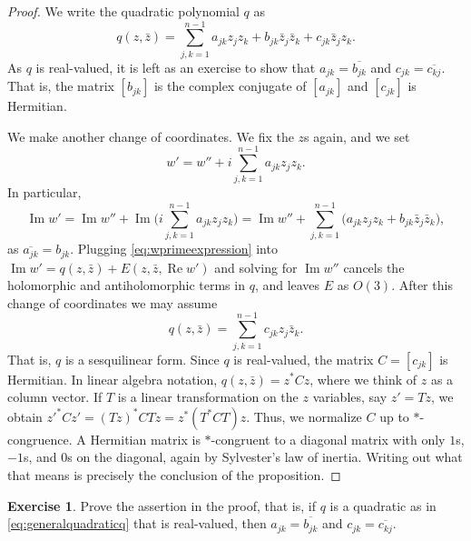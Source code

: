 \documentclass[12pt,openany]{book}
\renewcommand{\Re}{\operatorname{Re}}
\renewcommand{\Im}{\operatorname{Im}}
\theoremstyle{plain}
\theoremstyle{remark}
\theoremstyle{definition}
\newenvironment{exbox}{%
    \def\FrameCommand{\vrule width 1pt \relax\hspace{10pt}}%
    \MakeFramed{\advance\hsize-\width\FrameRestore}%
}{%
    \endMakeFramed
}
\theoremstyle{exercise}
\newtheorem{exercise}{Exercise}[section]
\theoremstyle{example}
\begin{document}
\begin{proof}
We write the quadratic polynomial $q$ as
\begin{equation} \label{eq:generalquadraticq}
q(z,\bar{z}) =
\sum_{j,k=1}^{n-1}
a_{jk} z_jz_k
+
b_{jk} \bar{z}_j\bar{z}_k
+
c_{jk} \bar{z}_jz_k .
\end{equation}
As $q$ is real-valued, it is left as an exercise to show that $a_{jk} =
\overline{b_{jk}}$ and $c_{jk} = \overline{c_{kj}}$.  That is, the
matrix $[b_{jk}]$ is the complex conjugate of $[a_{jk}]$ and
$[c_{jk}]$ is Hermitian.

We make another change of coordinates.  We fix the $z$s again, and we set
\begin{equation} \label{eq:wprimeexpression}
w' = w'' + i
\sum_{j,k=1}^{n-1}
a_{jk} z_jz_k .
\end{equation}
In particular,
\begin{equation*}
\Im w'
= \Im w''
+ \Im \biggl(
i
\sum_{j,k=1}^{n-1}
a_{jk} z_jz_k 
\biggr)
=
\Im w''
+
\sum_{j,k=1}^{n-1}
\bigl(
a_{jk} z_jz_k 
+
b_{jk} \bar{z}_j\bar{z}_k 
\bigr) ,
\end{equation*}
as $\overline{a_{jk}} = b_{jk}$.  Plugging
\eqref{eq:wprimeexpression} into $\Im w' = q(z,\bar{z}) + E(z,\bar{z},\Re w')$
and solving for $\Im w''$ cancels the
holomorphic and antiholomorphic terms in $q$, and leaves $E$ as $O(3)$.
After this change of coordinates we may assume
\begin{equation*}
q(z,\bar{z}) = \sum_{j,k=1}^{n-1} c_{jk} z_j \bar{z}_k .
\end{equation*}
That is, $q$ is a sesquilinear form.  Since $q$ is real-valued, the matrix
$C = [ c_{jk} ]$ is Hermitian.  In linear algebra notation,
$q(z,\bar{z}) = z^*Cz$,
where %
we think of $z$ as a column vector.
If $T$ is a linear transformation on the $z$ variables, say $z'=Tz$, we
obtain ${z'}^*Cz' = {(Tz)}^*CTz = z^* ( T^*CT) z$.  Thus, we normalize $C$
up to $*$-congruence.  A Hermitian matrix
is $*$-congruent to a diagonal matrix with only $1$s, $-1$s, and $0$s on the
diagonal, again by Sylvester's law of inertia.  Writing out what that means is precisely the conclusion of the
proposition.
\end{proof}

\begin{exbox}
\begin{exercise}
Prove the assertion in the proof, that is, if $q$ is a quadratic as in
\eqref{eq:generalquadraticq} that is real-valued, then
 $a_{jk} = \overline{b_{jk}}$ and $c_{jk} = \overline{c_{kj}}$.
\end{exercise}
\end{exbox}
\end{document}
